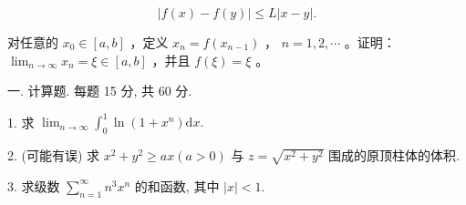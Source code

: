 \documentclass{examcollection}
\renewcommand{\displayformula}[1]{\[#1\]}
\begin{document}
{\begin{minipage}{\textwidth}
\displayformula{| f (x) - f (y) | \leq L | x - y |.}\par
对任意的  $x_{0} \in [a, b]$ ，定义  $x_{n} = f(x_{n-1})$ ， $n = 1, 2, \cdots$ 。证明： $\lim_{n \to \infty} x_{n} = \xi \in [a, b]$ ，并且  $f(\xi) = \xi$ 。\par
{}\smallskip
一. 计算题. 每题 15 分, 共 60 分.\par
1. 求 $\lim_{n\to \infty}\int_0^1\ln (1 + x^n)\mathrm{d}x.$\par
2. (可能有误) 求 $x^{2} + y^{2} \geq ax (a > 0)$ 与 $z = \sqrt{x^2 + y^2}$ 围成的原顶柱体的体积.\par
3. 求级数 $\sum_{n=1}^{\infty} n^{3} x^{n}$ 的和函数, 其中 $|x| < 1$.\par
\end{minipage}}
\ifdim\dimexpr\ht\proofbox+\dp\proofbox\relax>\textheight
\noindent\resizebox{!}{\textheight}{\usebox{\proofbox}}\else\noindent\usebox{\proofbox}\fi\clearpage
\end{document}
